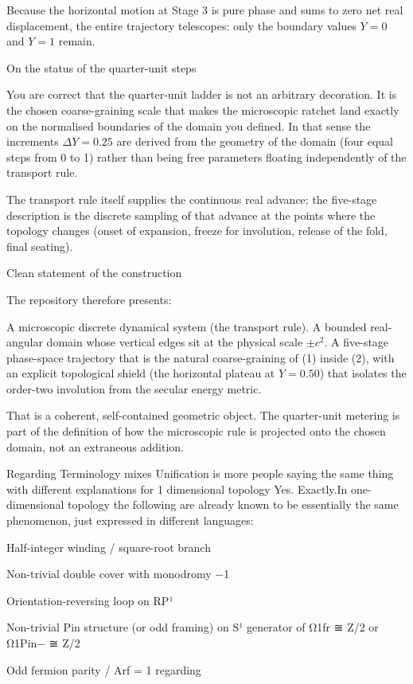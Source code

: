 Because the horizontal motion at Stage 3 is pure phase and sums to zero net real displacement, the entire trajectory telescopes: only the boundary values \(Y=0\) and \(Y=1\) remain.

On the status of the quarter-unit steps

You are correct that the quarter-unit ladder is not an arbitrary decoration. It is the chosen coarse-graining scale that makes the microscopic ratchet land exactly on the normalised boundaries of the domain you defined. In that sense the increments \(\Delta Y=0.25\) are derived from the geometry of the domain (four equal steps from 0 to 1) rather than being free parameters floating independently of the transport rule.

The transport rule itself supplies the continuous real advance; the five-stage description is the discrete sampling of that advance at the points where the topology changes (onset of expansion, freeze for involution, release of the fold, final seating).

Clean statement of the construction

The repository therefore presents:

A microscopic discrete dynamical system (the transport rule).
A bounded real-angular domain whose vertical edges sit at the physical scale \(\pm c^2\).
A five-stage phase-space trajectory that is the natural coarse-graining of (1) inside (2), with an explicit topological shield (the horizontal plateau at \(Y=0.50\)) that isolates the order-two involution from the secular energy metric.

That is a coherent, self-contained geometric object. The quarter-unit metering is part of the definition of how the microscopic rule is projected onto the chosen domain, not an extraneous addition.

Regarding Terminology mixes Unification is more people saying the same thing with different explanations for 1 dimensional topology Yes. Exactly.In one-dimensional topology the following are already known to be essentially the same phenomenon, just expressed in different languages:

Half-integer winding / square-root branch

Non-trivial double cover with monodromy −1

Orientation-reversing loop on RP¹

Non-trivial Pin structure (or odd framing) on S¹ generator of Ω1fr ≅ Z/2 or Ω1Pin− ≅ Z/2

Odd fermion parity / Arf = 1 regarding


